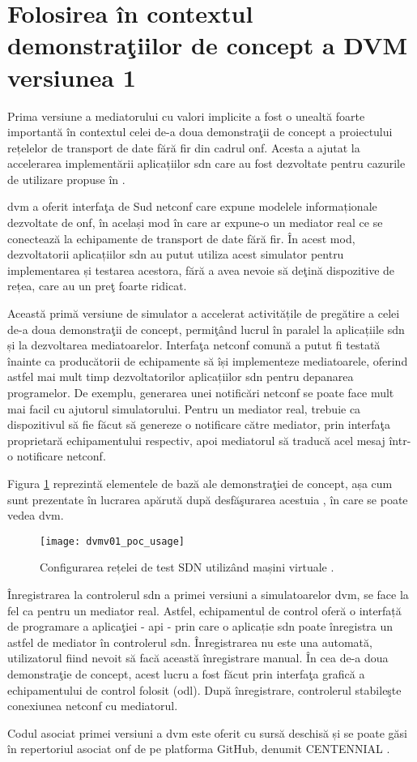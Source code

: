 \section{Folosirea în contextul demonstraţiilor de concept a DVM versiunea 1}

Prima versiune a mediatorului cu valori implicite a fost o unealtă foarte importantă în contextul celei de-a doua demonstraţii de concept a proiectului rețelelor de transport de date fără fir din cadrul \gls{onf}. Acesta a ajutat la accelerarea implementării aplicațiilor \gls{sdn} care au fost dezvoltate pentru cazurile de utilizare propuse în \cite{onf2016_poc2}.

\gls{dvm} a oferit interfaţa de Sud \gls{netconf} care expune modelele informaționale dezvoltate de \gls{onf}, în același mod în care ar expune-o un mediator real ce se conectează la echipamente de transport de date fără fir. În acest mod, dezvoltatorii aplicațiilor \gls{sdn} au putut utiliza acest simulator pentru implementarea și testarea acestora, fără a avea nevoie să deţină dispozitive de rețea, care au un preţ foarte ridicat.

Această primă versiune de simulator a accelerat activitățile de pregătire a celei de-a doua demonstraţii de concept, permiţând lucrul în paralel la aplicațiile \gls{sdn} și la dezvoltarea mediatoarelor. Interfaţa \gls{netconf} comună a putut fi testată înainte ca producătorii de echipamente să își implementeze mediatoarele, oferind astfel mai mult timp dezvoltatorilor aplicațiilor \gls{sdn} pentru depanarea programelor. De exemplu, generarea unei notificări \gls{netconf} se poate face mult mai facil cu ajutorul simulatorului. Pentru un mediator real, trebuie ca dispozitivul să fie făcut să genereze o notificare către mediator, prin interfaţa proprietară echipamentului respectiv, apoi mediatorul să traducă acel mesaj într-o notificare \gls{netconf}.

Figura \ref{fig:dvmv01_poc_usage} reprezintă elementele de bază ale demonstraţiei de concept, așa cum sunt prezentate în lucrarea apărută după desfăşurarea acestuia \cite{onf2016_poc2}, în care se poate vedea \gls{dvm}.

\begin{figure}[h]
	\centering
	\texttt{[image: dvmv01\_poc\_usage]}
	\caption{Configurarea rețelei de test SDN utilizând mașini virtuale \cite{onf2016_poc2}.}
	\label{fig:dvmv01_poc_usage}
\end{figure}

Înregistrarea la controlerul \gls{sdn} a primei versiuni a simulatoarelor \gls{dvm}, se face la fel ca pentru un mediator real. Astfel, echipamentul de control oferă o interfață de programare a aplicaţiei - \gls{api} - prin care o aplicație \gls{sdn} poate înregistra un astfel de mediator în controlerul \gls{sdn}. Înregistrarea nu este una automată, utilizatorul fiind nevoit să facă această înregistrare manual. În cea de-a doua demonstraţie de concept, acest lucru a fost făcut prin interfaţa grafică a echipamentului de control folosit (\gls{odl}). După înregistrare, controlerul stabileşte conexiunea \gls{netconf} cu mediatorul.

Codul asociat primei versiuni a \gls{dvm} este oferit cu sursă deschisă și se poate găsi în repertoriul asociat \gls{onf} de pe platforma GitHub, denumit CENTENNIAL \cite{dvmv01github}.